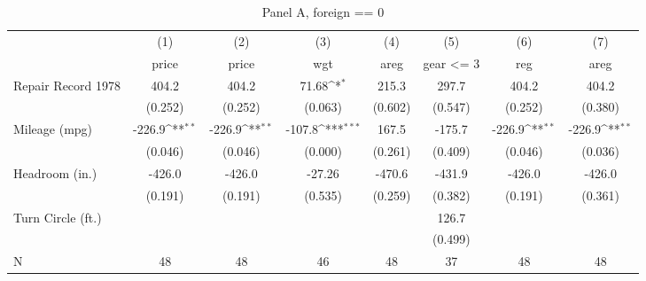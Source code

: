 \begin{table}[htbp]\centering
\def\sym#1{\ifmmode^{#1}\else\(^{#1}\)\fi}
\caption{Panel A, foreign == 0}
\begin{tabular}{l*{7}{c}}
\toprule
                    &\multicolumn{1}{c}{(1)}&\multicolumn{1}{c}{(2)}&\multicolumn{1}{c}{(3)}&\multicolumn{1}{c}{(4)}&\multicolumn{1}{c}{(5)}&\multicolumn{1}{c}{(6)}&\multicolumn{1}{c}{(7)}\\
                    &\multicolumn{1}{c}{price}&\multicolumn{1}{c}{price}&\multicolumn{1}{c}{wgt}&\multicolumn{1}{c}{areg}&\multicolumn{1}{c}{gear <= 3}&\multicolumn{1}{c}{reg}&\multicolumn{1}{c}{areg}\\
\midrule
Repair Record 1978  &       404.2         &       404.2         &       71.68\sym{*}  &       215.3         &       297.7         &       404.2         &       404.2         \\
                    &     (0.252)         &     (0.252)         &     (0.063)         &     (0.602)         &     (0.547)         &     (0.252)         &     (0.380)         \\
\addlinespace
Mileage (mpg)       &      -226.9\sym{**} &      -226.9\sym{**} &      -107.8\sym{***}&       167.5         &      -175.7         &      -226.9\sym{**} &      -226.9\sym{**} \\
                    &     (0.046)         &     (0.046)         &     (0.000)         &     (0.261)         &     (0.409)         &     (0.046)         &     (0.036)         \\
\addlinespace
Headroom (in.)      &      -426.0         &      -426.0         &      -27.26         &      -470.6         &      -431.9         &      -426.0         &      -426.0         \\
                    &     (0.191)         &     (0.191)         &     (0.535)         &     (0.259)         &     (0.382)         &     (0.191)         &     (0.361)         \\
\addlinespace
Turn Circle (ft.)   &                     &                     &                     &                     &       126.7         &                     &                     \\
                    &                     &                     &                     &                     &     (0.499)         &                     &                     \\
\midrule
N                   &          48         &          48         &          46         &          48         &          37         &          48         &          48         \\

\end{tabular}
\end{table}
